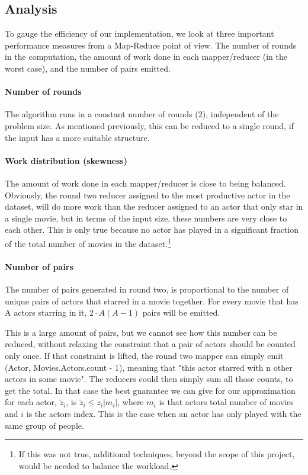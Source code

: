 \documentclass[a4paper,11pt]{article}
\begin{document}
\subsection{Analysis}
To gauge the efficiency of our implementation, we look at three important performance measures from a Map-Reduce point of view. The number of rounds in the computation, the amount of work done in each mapper/reducer (in the worst case), and the number of pairs emitted.

\paragraph{Number of rounds}
The algorithm runs in a constant number of rounds (2), independent of the problem size. As mentioned previously, this can be reduced to a single round, if the input has a more suitable structure.

\paragraph{Work distribution (skewness)}
The amount of work done in each mapper/reducer is close to being balanced. Obviously, the round two reducer assigned to the most productive actor in the dataset, will do more work than the reducer assigned to an actor that only star in a single movie, but in terms of the input size, these numbers are very close to each other. This is only true because no actor has played in a significant fraction of the total number of movies in the dataset.\footnote{If this was not true, additional techniques, beyond the scope of this project, would be needed to balance the workload.} 

\paragraph{Number of pairs}
The number of pairs generated in round two, is proportional to the number of unique pairs of actors that starred in a movie together. For every movie that has A actors starring in it, $2 \cdot A(A-1)$ pairs will be emitted. %

This is a large amount of pairs, but we cannot see how this number can be reduced, without relaxing the constraint that a pair of actors should be counted only once. If that constraint is lifted, the round two mapper can simply emit (Actor, Movies.Actors.count - 1), meaning that "this actor starred with n other actors in some movie". The reducers could then simply sum all those counts, to get the total.
In that case the best guarantee we can give for our approximation for each actor, $\tilde{z}_i$, is $\tilde{z}_i \leq z_i |m_i|$, where $m_i$ is that actors total number of movies and $i$ is the actors index. This is the case when an actor has only played with the same group of people. 
\\
\end{document}

